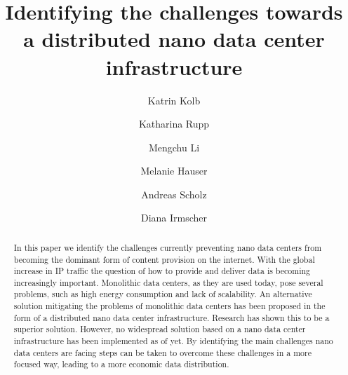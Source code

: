 \documentclass[sigchi-a, authorversion]{acmart}
\begin{document}
\title{Identifying the challenges towards a distributed nano data center infrastructure}

\author{Katrin Kolb}

\author{Katharina Rupp}

\author{Mengchu Li}

\author{Melanie Hauser}

\author{Andreas Scholz}

\author{Diana Irmscher} 

\renewcommand{\shortauthors}{Katrin Kolb et al.}

  
\begin{abstract} %
In this paper we identify the challenges currently preventing nano data centers from becoming the dominant form of content provision on the internet. With the global increase in IP traffic the question of how to provide and deliver data is becoming increasingly important. Monolithic data centers, as they are used today, pose several problems, such as high energy consumption and lack of scalability. An alternative solution mitigating the problems of monolithic data centers has been proposed in the form of a distributed nano data center infrastructure. Research has shown this to be a superior solution. However, no widespread solution based on a nano data center infrastructure has been implemented as of yet. By identifying the main challenges nano data centers are facing steps can be taken to overcome these challenges in a more focused way, leading to a more economic data distribution. 
\end{abstract}

\end{document}
